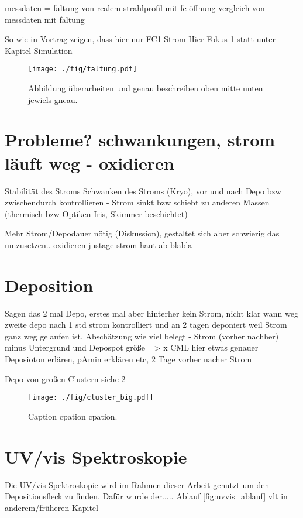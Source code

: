 messdaten = faltung von realem strahlprofil mit fc öffnung
vergleich von messdaten mit faltung 

So wie in Vortrag zeigen, dass hier nur FC1 Strom
Hier Fokus \ref{fig:faltung} statt unter Kapitel Simulation
\begin{figure}
    \centering
    \texttt{[image: ./fig/faltung.pdf]}
    \caption{Abbildung überarbeiten und genau beschreiben oben mitte unten jewiels gneau.}
    \label{fig:faltung}
\end{figure}

\section{Probleme? schwankungen, strom läuft weg - oxidieren}
Stabilität des Stroms
Schwanken des Stroms (Kryo), vor und nach Depo bzw zwischendurch kontrollieren - 
Strom sinkt bzw schiebt zu anderen Massen (thermisch bzw Optiken-Iris, Skimmer beschichtet)

Mehr Strom/Depodauer nötig (Diskussion), gestaltet sich aber schwierig das umzusetzen.. 
oxidieren justage strom haut ab blabla


\section{Deposition}
Sagen das 2 mal Depo, erstes mal aber hinterher kein Strom, nicht klar wann weg
zweite depo nach 1 std strom kontrolliert und an 2 tagen deponiert weil Strom ganz weg gelaufen ist.
Abschätzung wie viel belegt - Strom (vorher nachher) minus Untergrund und Depospot größe => x CML
hier etwas genauer Deposioton erlären, pAmin erklären etc, 2 Tage vorher nacher Strom 

Depo von großen Clustern siehe \ref{fig:cluster_big}
\begin{figure}
    \centering
    \texttt{[image: ./fig/cluster\_big.pdf]}
    \caption{Caption cpation cpation.}
    \label{fig:cluster_big}
\end{figure}

\newpage
\section{UV/vis Spektroskopie}
Die UV/vis Spektroskopie wird im Rahmen dieser Arbeit genutzt um den Depositionsfleck zu finden.
Dafür wurde der.....
Ablauf \ref{fig:uvvis_ablauf} vlt in anderem/früheren Kapitel


